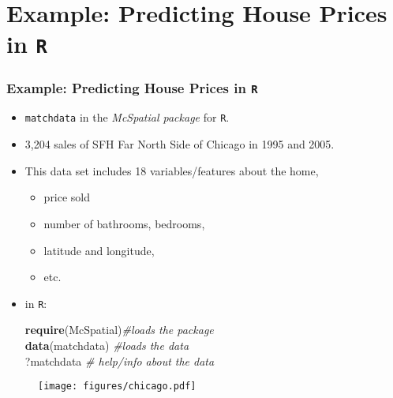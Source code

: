 \documentclass[
  shownotes,
  xcolor={svgnames},
  hyperref={colorlinks,citecolor=DarkBlue,linkcolor=DarkRed,urlcolor=DarkBlue}
  ]{beamer}
\newenvironment{Shaded}{\begin{snugshade}}{\end{snugshade}}
\newcommand{\CommentTok}[1]{\textcolor[rgb]{0.56,0.35,0.01}{\textit{#1}}}
\newcommand{\KeywordTok}[1]{\textcolor[rgb]{0.13,0.29,0.53}{\textbf{#1}}}
\newcommand{\NormalTok}[1]{#1}
\begin{document}
\section{Example: Predicting House Prices in \texttt{R}}
\begin{frame}[fragile]
\frametitle{Example: Predicting House Prices in \texttt{R}}



    \begin{minipage}[t]{0.48\linewidth}

    \begin{itemize}
      \footnotesize
    \item  \texttt{matchdata}  in the
\emph{McSpatial package} for \texttt{R}. 
  \item  3,204 sales of SFH Far North Side of Chicago in 1995 and 2005. 
  \item This data set includes 18 variables/features about the home, 
  \begin{itemize}
    \tiny
    \item price sold
    \item number of bathrooms, bedrooms, 
    \item latitude and longitude,
    \item etc. 
  \end{itemize}
  \item  in \texttt{R}:
  \medskip
  
      \begin{Shaded}
      
        \footnotesize
        \KeywordTok{require}\NormalTok{(McSpatial)}\CommentTok{\tiny \#loads the package}    \\

          \KeywordTok{data}\NormalTok{(matchdata) }\CommentTok{\tiny \#loads the data}    \\

          \NormalTok{?matchdata }\CommentTok{\tiny \# help/info about  the data}    \\
      
      \end{Shaded}
       \end{itemize} 
    \end{minipage}
    \hfill
    \begin{minipage}[t]{0.48\linewidth}%
    \bigskip
        \begin{figure}[H] \centering
            \captionsetup{justification=centering}  
            \texttt{[image: figures/chicago.pdf]}
    \end{figure}
    \end{minipage}
\end{frame}
\end{document}
